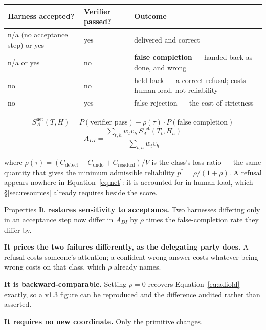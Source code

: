 \documentclass[11pt]{article}
\theoremstyle{definition}
\begin{document}
\begin{table}[h]
\centering\small
\begin{tabularx}{\textwidth}{@{}llY@{}}
\toprule
Harness accepted? & Verifier passed? & Outcome \\
\midrule
n/a (no acceptance step) or yes & yes & delivered and correct \\
n/a or yes & no & \textbf{false completion} --- handed back as done, and wrong \\
no & no & held back --- a correct refusal; costs human load, not reliability \\
no & yes & false rejection --- the cost of strictness \\
\bottomrule
\end{tabularx}
\end{table}

\begin{equation}
S^{\text{net}}_A(T,H) = P(\text{verifier pass}) - \rho(\tau)\cdot P(\text{false completion})
\label{eq:net}
\end{equation}
\begin{equation}
A_{DI} = \frac{\sum_{t,h} w_t v_h\, S^{\text{net}}_A(T_t,H_h)}{\sum_{t,h} w_t v_h}
\end{equation}

where $\rho(\tau) = (C_{\text{detect}} + C_{\text{undo}} + C_{\text{residual}})/V$ is the class's loss ratio --- the same quantity that gives the minimum admissible reliability $p^{*} = \rho/(1+\rho)$. A refusal appears nowhere in Equation~\eqref{eq:net}: it is accounted for in human load, which \S\ref{sec:resources} already requires beside the score.

\begin{claimbox}{Properties}
\textbf{It restores sensitivity to acceptance.} Two harnesses differing only in an acceptance step now differ in $A_{DI}$ by $\rho$ times the false-completion rate they differ by.

\textbf{It prices the two failures differently, as the delegating party does.} A refusal costs someone's attention; a confident wrong answer costs whatever being wrong costs on that class, which $\rho$ already names.

\textbf{It is backward-comparable.} Setting $\rho = 0$ recovers Equation~\eqref{eq:adiold} exactly, so a v1.3 figure can be reproduced and the difference audited rather than asserted.

\textbf{It requires no new coordinate.} Only the primitive changes.
\end{claimbox}
\end{document}
